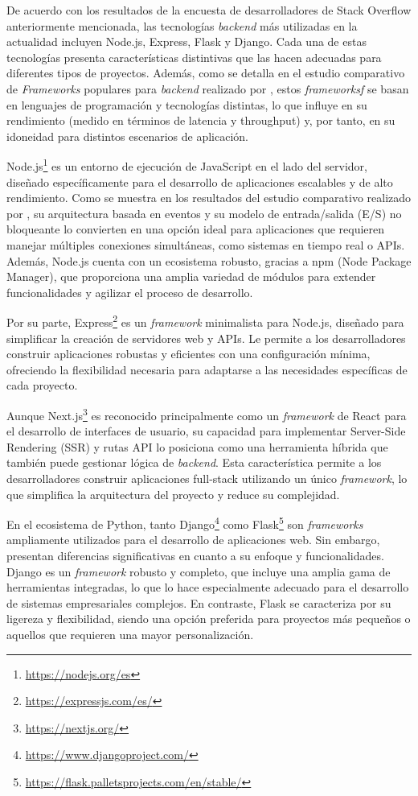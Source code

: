 De acuerdo con los resultados de la encuesta de desarrolladores de Stack Overflow anteriormente mencionada, las tecnologías \textit{backend} más utilizadas en la actualidad incluyen Node.js, Express, Flask y Django. Cada una de estas tecnologías presenta características distintivas que las hacen adecuadas para diferentes tipos de proyectos. Además, como se detalla en el estudio comparativo de \textit{Frameworks} populares para \textit{backend} realizado por \cite{Buljic_Kadusic_Cvijanovic_Hadzajlic_Zivic_2025}, estos \textit{frameworksf} se basan en lenguajes de programación y tecnologías distintas, lo que influye en su rendimiento (medido en términos de latencia y throughput) y, por tanto, en su idoneidad para distintos escenarios de aplicación.

Node.js\footnote{\url{https://nodejs.org/es}} es un entorno de ejecución de JavaScript en el lado del servidor, diseñado específicamente para el desarrollo de aplicaciones escalables y de alto rendimiento. Como se muestra en los resultados del estudio comparativo realizado por \cite{Lei_Ma_Tan_2014}, su arquitectura basada en eventos y su modelo de entrada/salida (E/S) no bloqueante lo convierten en una opción ideal para aplicaciones que requieren manejar múltiples conexiones simultáneas, como sistemas en tiempo real o APIs. Además, Node.js cuenta con un ecosistema robusto, gracias a npm (Node Package Manager), que proporciona una amplia variedad de módulos para extender funcionalidades y agilizar el proceso de desarrollo.

Por su parte, Express\footnote{\url{https://expressjs.com/es/}} es un \textit{framework} minimalista para Node.js, diseñado para simplificar la creación de servidores web y APIs. Le permite a los desarrolladores construir aplicaciones robustas y eficientes con una configuración mínima, ofreciendo la flexibilidad necesaria para adaptarse a las necesidades específicas de cada proyecto.

Aunque Next.js\footnote{\url{https://nextjs.org/}} es reconocido principalmente como un \textit{framework} de React para el desarrollo de interfaces de usuario, su capacidad para implementar Server-Side Rendering (SSR) y rutas API lo posiciona como una herramienta híbrida que también puede gestionar lógica de \textit{backend}. Esta característica permite a los desarrolladores construir aplicaciones full-stack utilizando un único \textit{framework}, lo que simplifica la arquitectura del proyecto y reduce su complejidad.

En el ecosistema de Python, tanto Django\footnote{\url{https://www.djangoproject.com/}} como Flask\footnote{\url{https://flask.palletsprojects.com/en/stable/}} son \textit{frameworks} ampliamente utilizados para el desarrollo de aplicaciones web. Sin embargo, presentan diferencias significativas en cuanto a su enfoque y funcionalidades. Django es un \textit{framework} robusto y completo, que incluye una amplia gama de herramientas integradas, lo que lo hace especialmente adecuado para el desarrollo de sistemas empresariales complejos. En contraste, Flask se caracteriza por su ligereza y flexibilidad, siendo una opción preferida para proyectos más pequeños o aquellos que requieren una mayor personalización.


